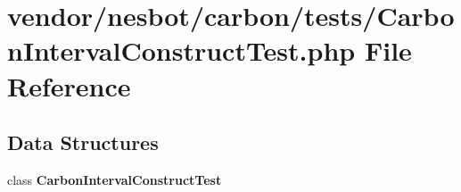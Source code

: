 \section{vendor/nesbot/carbon/tests/\+Carbon\+Interval\+Construct\+Test.php File Reference}
\label{_carbon_interval_construct_test_8php}
\subsection*{Data Structures}
\begin{DoxyCompactItemize}
\item 
class {\bf Carbon\+Interval\+Construct\+Test}
\end{DoxyCompactItemize}

